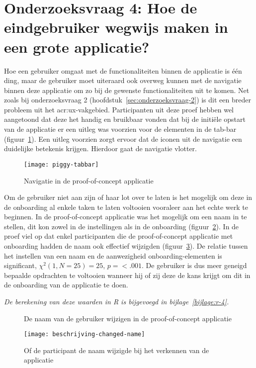 \section[Onderzoeksvraag 4]{Onderzoeksvraag 4: Hoe de eindgebruiker wegwijs maken in een grote applicatie?}
\label{sec:onderzoeksvraag-4}

Hoe een gebruiker omgaat met de functionaliteiten binnen de applicatie is één ding, maar de gebruiker moet uiteraard ook overweg kunnen met de navigatie binnen deze applicatie om zo bij de gewenste functionaliteiten uit te komen. Net zoals bij onderzoeksvraag 2 (hoofdstuk~\ref{sec:onderzoeksvraag-2}) is dit een breder probleem uit het \acrshort{acr:ux}-vakgebied. Participanten uit deze proef hebben wel aangetoond dat deze het handig en bruikbaar vonden dat bij de initiële opstart van de applicatie er een uitleg was voorzien voor de elementen in de tab-bar (figuur~\ref{fig:piggy:tabbar}). Een uitleg voorzien zorgt ervoor dat de iconen uit de navigatie een duidelijke betekenis krijgen. Hierdoor gaat de navigatie vlotter.

\begin{figure}[h!]
    \centering
    \texttt{[image: piggy-tabbar]}
    \caption{Navigatie in de proof-of-concept applicatie}
    \label{fig:piggy:tabbar}
\end{figure}

Om de gebruiker niet aan zijn of haar lot over te laten is het mogelijk om deze in de onboarding al enkele taken te laten voltooien vooraleer aan het echte werk te beginnen. In de proof-of-concept applicatie was het mogelijk om een naam in te stellen, dit kon zowel in de instellingen als in de onboarding (figuur~\ref{fig:piggy:name}). In de proef viel op dat enkel participanten die de proof-of-concept applicatie met onboarding hadden de naam ook effectief wijzigden (figuur~\ref{fig:beschrijving-changed-name}). De relatie tussen het instellen van een naam en de aanwezigheid onboarding-elementen is significant, $\chi^2 (1, N = 25) = 25$, $p = < .001$. De gebruiker is dus meer geneigd bepaalde opdrachten te voltooien wanneer hij of zij deze de kans krijgt om dit in de onboarding van de applicatie te doen.

\textit{De berekening van deze waarden in R is bijgevoegd in bijlage~\ref{bijlage:r-4}.}

\begin{figure}[h!]
	\centering
	\qquad
	\qquad
	\caption{De naam van de gebruiker wijzigen in de proof-of-concept applicatie}
	\label{fig:piggy:name}
\end{figure}

\begin{figure}[h]
	\centering
	\texttt{[image: beschrijving-changed-name]}
	\caption{Of de participant de naam wijzigde bij het verkennen van de applicatie}
	\label{fig:beschrijving-changed-name}
\end{figure}
